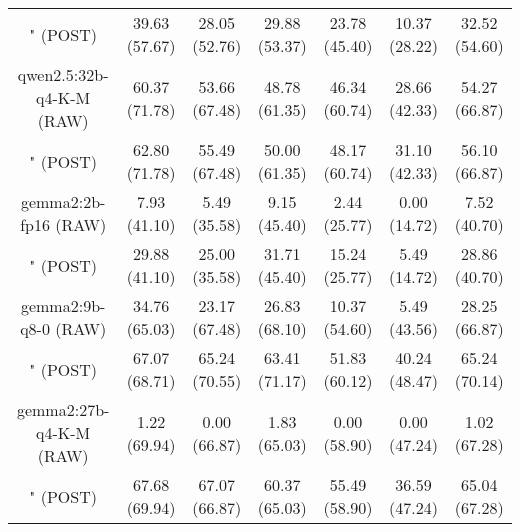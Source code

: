 \begin{table}[]
{\begin{tabular}{ccccccc}
        

        \multicolumn{1}{c|}{" (POST)} & 39.63 (57.67) & 28.05 (52.76) & \multicolumn{1}{c|}{29.88 (53.37)} & 23.78 (45.40) & \multicolumn{1}{c|}{10.37 (28.22)} & 32.52 (54.60) \\
        \cline{1-7}
        

        \multicolumn{1}{c|}{qwen2.5:32b-q4-K-M (RAW)} & 60.37 (71.78) & 53.66 (67.48) & \multicolumn{1}{c|}{48.78 (61.35)} & 46.34 (60.74) & \multicolumn{1}{c|}{28.66 (42.33)} & 54.27 (66.87) \\
        
        

        \multicolumn{1}{c|}{" (POST)} & 62.80 (71.78) & 55.49 (67.48) & \multicolumn{1}{c|}{50.00 (61.35)} & 48.17 (60.74) & \multicolumn{1}{c|}{31.10 (42.33)} & 56.10 (66.87) \\
        \cline{1-7}
        

        \multicolumn{1}{c|}{gemma2:2b-fp16 (RAW)} & 7.93 (41.10) & 5.49 (35.58) & \multicolumn{1}{c|}{9.15 (45.40)} & 2.44 (25.77) & \multicolumn{1}{c|}{0.00 (14.72)} & 7.52 (40.70) \\
        
        

        \multicolumn{1}{c|}{" (POST)} & 29.88 (41.10) & 25.00 (35.58) & \multicolumn{1}{c|}{31.71 (45.40)} & 15.24 (25.77) & \multicolumn{1}{c|}{5.49 (14.72)} & 28.86 (40.70) \\
        \cline{1-7}
        

        \multicolumn{1}{c|}{gemma2:9b-q8-0 (RAW)} & 34.76 (65.03) & 23.17 (67.48) & \multicolumn{1}{c|}{26.83 (68.10)} & 10.37 (54.60) & \multicolumn{1}{c|}{5.49 (43.56)} & 28.25 (66.87) \\
        
        

        \multicolumn{1}{c|}{" (POST)} & 67.07 (68.71) & 65.24 (70.55) & \multicolumn{1}{c|}{63.41 (71.17)} & 51.83 (60.12) & \multicolumn{1}{c|}{40.24 (48.47)} & 65.24 (70.14) \\
        \cline{1-7}
        

        \multicolumn{1}{c|}{gemma2:27b-q4-K-M (RAW)} & 1.22 (69.94) & 0.00 (66.87) & \multicolumn{1}{c|}{1.83 (65.03)} & 0.00 (58.90) & \multicolumn{1}{c|}{0.00 (47.24)} & 1.02 (67.28) \\
        
        

        \multicolumn{1}{c|}{" (POST)} & 67.68 (69.94) & 67.07 (66.87) & \multicolumn{1}{c|}{60.37 (65.03)} & 55.49 (58.90) & \multicolumn{1}{c|}{36.59 (47.24)} & 65.04 (67.28) \\
        \cline{1-7}
        


\end{tabular}}
\end{table}

